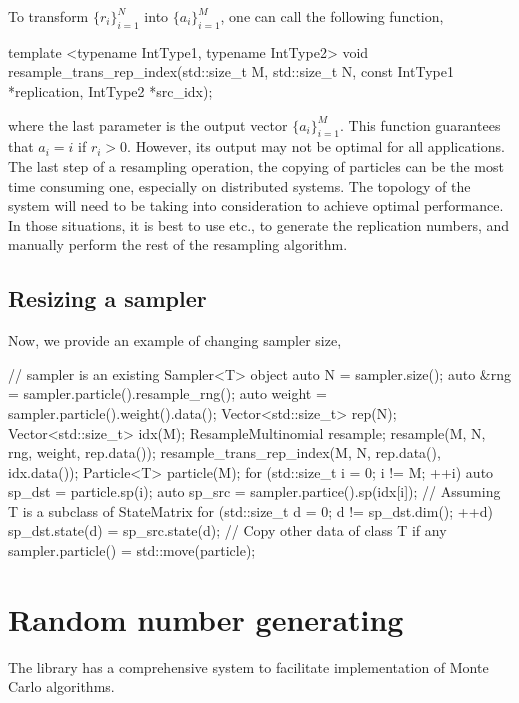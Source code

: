 \documentclass[11pt,bib,mint,hyper,altcolor]{marticle}
\begin{document}
To transform $\{r_i\}_{i=1}^N$ into $\{a_i\}_{i=1}^M$, one can call the
following function,
\begin{cppcode}
template <typename IntType1, typename IntType2>
void resample_trans_rep_index(std::size_t M, std::size_t N,
    const IntType1 *replication, IntType2 *src_idx);
\end{cppcode}
where the last parameter is the output vector $\{a_i\}_{i=1}^M$. This function
guarantees that $a_i = i$ if $r_i > 0$. However, its output may not be
optimal for all applications. The last step of a resampling operation, the
copying of particles can be the most time consuming one, especially on
distributed systems. The topology of the system will need to be taking into
consideration to achieve optimal performance. In those situations, it is best
to use  etc., to generate the replication
numbers, and manually perform the rest of the resampling algorithm.

\subsection{Resizing a sampler}
\label{sub:Resizing a sampler}

Now, we provide an example of changing sampler size,
\begin{cppcode}
  // sampler is an existing Sampler<T> object
  auto N = sampler.size();
  auto &rng = sampler.particle().resample_rng();
  auto weight = sampler.particle().weight().data();
  Vector<std::size_t> rep(N);
  Vector<std::size_t> idx(M);
  ResampleMultinomial resample;
  resample(M, N, rng, weight, rep.data());
  resample_trans_rep_index(M, N, rep.data(), idx.data());
  Particle<T> particle(M);
  for (std::size_t i = 0; i != M; ++i) {
      auto sp_dst = particle.sp(i);
      auto sp_src = sampler.partice().sp(idx[i]);
      // Assuming T is a subclass of StateMatrix
      for (std::size_t d = 0; d != sp_dst.dim(); ++d)
          sp_dst.state(d) = sp_src.state(d);
  }
  // Copy other data of class T if any
  sampler.particle() = std::move(particle);
\end{cppcode}

\section{Random number generating}
\label{sec:Random number generating}

The library has a comprehensive \rng system to facilitate implementation of
Monte Carlo algorithms.
\end{document}
